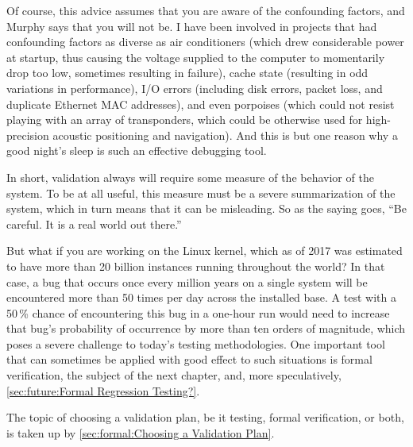 Of course, this advice assumes that you are aware of the confounding
factors, and Murphy says that you will not be.
I have been involved in projects that had confounding factors as diverse
as air conditioners (which drew considerable power at startup, thus
causing the voltage supplied to the computer to momentarily drop too
low, sometimes resulting in failure), cache state (resulting in odd
variations in performance), I/O errors (including disk errors, packet
loss, and duplicate Ethernet MAC addresses), and even porpoises (which
could not resist playing with an array of transponders, which could be
otherwise used for high-precision acoustic positioning and navigation).
And this is but one reason why a good night's sleep is such an effective
debugging tool.

In short, validation always will require some measure of the behavior of
the system.
To be at all useful, this measure must be a severe summarization of the
system, which in turn means that it can be misleading.
So as the saying goes, ``Be careful.
It is a real world out there.''

But what if you are working on the Linux kernel, which as of 2017 was
estimated to have more than 20 billion instances running throughout
the world?
In that case, a bug that occurs once every million years on a single system
will be encountered more than 50 times per day across the installed base.
A test with a 50\,\% chance of encountering this bug in a one-hour run
would need to increase that bug's probability of occurrence by more than
ten orders of magnitude, which poses a severe challenge to
today's testing methodologies.
One important tool that can sometimes be applied with good effect to
such situations is formal verification, the subject of the next chapter,
and, more speculatively, \cref{sec:future:Formal Regression Testing?}.

The topic of choosing a validation plan, be it testing, formal
verification, or both, is taken up by
\cref{sec:formal:Choosing a Validation Plan}.

